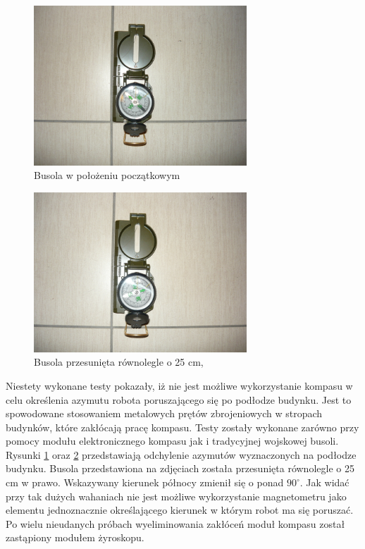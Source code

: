 \begin{figure}[!ht]
 \centering
 \includegraphics[height=60mm]{../images/ch04/compass01.jpg}
 \caption{Busola w położeniu początkowym}
 \label{fig:Busola1}
\end{figure}

\begin{figure}[!ht]
 \centering
 \includegraphics[height=60mm]{../images/ch04/compass02.jpg}
 \caption{Busola przesunięta równolegle o 25 cm,}
 \label{fig:Busola2}
\end{figure}

Niestety wykonane testy pokazały, iż nie jest możliwe wykorzystanie kompasu w celu określenia azymutu robota poruszającego się po podłodze budynku. Jest to spowodowane stosowaniem metalowych prętów zbrojeniowych w stropach budynków, które zakłócają pracę kompasu. Testy zostały wykonane zarówno przy pomocy modułu elektronicznego kompasu jak i tradycyjnej wojskowej busoli. Rysunki \ref{fig:Busola1} oraz \ref{fig:Busola2} przedstawiają odchylenie azymutów wyznaczonych na podłodze budynku. Busola przedstawiona na zdjęciach została przesunięta równolegle o 25 cm w prawo. Wskazywany kierunek północy zmienił się o ponad $90^{\circ}$. Jak widać przy tak dużych wahaniach nie jest możliwe wykorzystanie magnetometru jako elementu jednoznacznie określającego kierunek w którym robot ma się poruszać. Po wielu nieudanych próbach wyeliminowania zakłóceń moduł kompasu został zastąpiony modułem żyroskopu.

